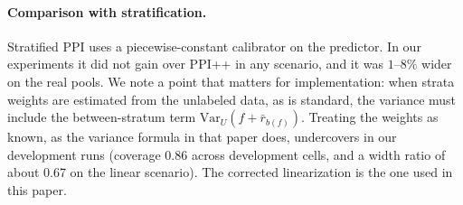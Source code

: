 \paragraph{Comparison with stratification.}
Stratified PPI \citep{fisch2024strat} uses a piecewise-constant calibrator on the predictor. In our experiments it did not gain over PPI++ in any scenario, and it was $1$--$8\%$ wider on the real pools. We note a point that matters for implementation: when strata weights are estimated from the unlabeled data, as is standard, the variance must include the between-stratum term $\mathrm{Var}_U(f+\bar r_{b(f)})$. Treating the weights as known, as the variance formula in that paper does, undercovers in our development runs (coverage 0.86 across development cells, and a width ratio of about 0.67 on the linear scenario). The corrected linearization is the one used in this paper.


